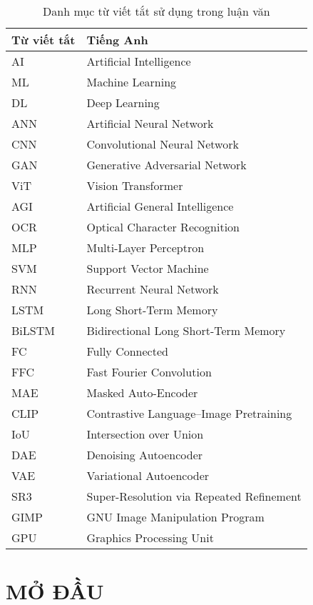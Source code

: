 \documentclass[12pt]{report}
\begin{document}
\begin{table}[H]
\centering
\caption{Danh mục từ viết tắt sử dụng trong luận văn}
\begin{tabular}{|l|l|}
    \hline
    \textbf{Từ viết tắt} & \textbf{Tiếng Anh} \\
    \hline
    AI    & Artificial Intelligence \\
    ML    & Machine Learning \\
    DL    & Deep Learning \\
    ANN   & Artificial Neural Network \\
    CNN   & Convolutional Neural Network \\
    GAN   & Generative Adversarial Network \\
    ViT   & Vision Transformer \\
    AGI   & Artificial General Intelligence \\
    OCR   & Optical Character Recognition \\
    MLP   & Multi-Layer Perceptron \\
    SVM   & Support Vector Machine \\
    RNN   & Recurrent Neural Network \\
    LSTM  & Long Short-Term Memory \\
    BiLSTM& Bidirectional Long Short-Term Memory \\
    FC    & Fully Connected \\
    FFC   & Fast Fourier Convolution \\
    MAE   & Masked Auto-Encoder \\
    CLIP  & Contrastive Language–Image Pretraining \\
    IoU   & Intersection over Union \\
    DAE   & Denoising Autoencoder \\
    VAE   & Variational Autoencoder \\
    SR3   & Super-Resolution via Repeated Refinement \\
    GIMP  & GNU Image Manipulation Program \\
    GPU   & Graphics Processing Unit \\
    \hline
\end{tabular}
\end{table}

\chapter*{MỞ ĐẦU}
\end{document}
